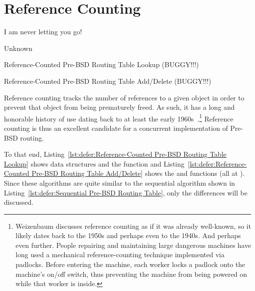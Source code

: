 
\section{Reference Counting}
\label{sec:defer:Reference Counting}
%
\epigraph{I am never letting you go!}{Unknown}

\begin{listing}[tbp]

\caption{Reference-Counted Pre-BSD Routing Table Lookup (BUGGY!!!)}
\label{lst:defer:Reference-Counted Pre-BSD Routing Table Lookup}
\end{listing}

\begin{listing}[tbp]

\caption{Reference-Counted Pre-BSD Routing Table Add\slash Delete (BUGGY!!!)}
\label{lst:defer:Reference-Counted Pre-BSD Routing Table Add/Delete}
\end{listing}

Reference counting tracks the number of references to a given object in
order to prevent that object from being prematurely freed.
As such, it has a long and honorable history of use dating back to
at least the early
1960s~\cite{Weizenbaum:1963:SLP:367593.367617}.\footnote{
	Weizenbaum discusses reference counting as if it was already
	well-known, so it likely dates back to the 1950s and perhaps
	even to the 1940s.
	And perhaps even further.
	People repairing and maintaining large dangerous machines have long
	used a mechanical reference-counting technique implemented via
	padlocks.
	Before entering the machine, each worker locks a padlock onto
	the machine's on/off switch, thus preventing the machine from
	being powered on while that worker is inside.}
Reference counting is thus an excellent candidate for a concurrent
implementation of Pre-BSD routing.

To that end,
Listing~\ref{lst:defer:Reference-Counted Pre-BSD Routing Table Lookup}
shows data structures and the  function and
Listing~\ref{lst:defer:Reference-Counted Pre-BSD Routing Table Add/Delete}
shows the  and  functions
(all at ).
Since these algorithms are quite similar to the sequential algorithm
shown in
Listing~\ref{lst:defer:Sequential Pre-BSD Routing Table},
only the differences will be discussed.

